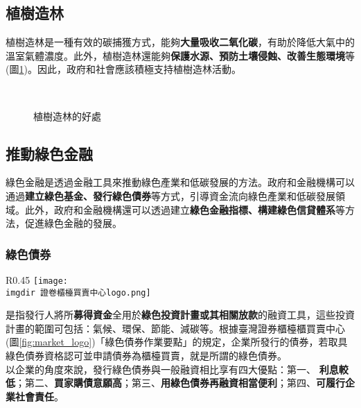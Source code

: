 \documentclass[12pt, a4paper]{article}
\begin{document}
\subsection{植樹造林}
植樹造林是一種有效的碳捕獲方式，能夠\textbf{\BB 大量吸收二氧化碳}，有助於降低大氣中的溫室氣體濃度。此外，植樹造林還能夠\textbf{\BB 保護水源、預防土壤侵蝕、改善生態環境}等(圖\ref{fig:tree})。因此，政府和社會應該積極支持植樹造林活動。
\begin{figure} [h]
    \centering
    \hspace{0.5cm} \\
    \hspace{0.5cm} 
    \caption{植樹造林的好處}\label{fig:tree}
\end{figure}


\subsection{推動綠色金融}
綠色金融是透過金融工具來推動綠色產業和低碳發展的方法。政府和金融機構可以通過\textbf{\BB 建立綠色基金、發行綠色債券}等方式，引導資金流向綠色產業和低碳發展領域。此外，政府和金融機構還可以透過建立\textbf{\BB 綠色金融指標、構建綠色信貸體系}等方法，促進綠色金融的發展。\\


\subsubsection{綠色債券}
\begin{wrapfigure}{R}{0.45\textwidth}
\centering
\texttt{[image: \\imgdir 證卷櫃檯買賣中心logo.png]}
\vspace{1.5cm}
\caption{證卷櫃檯買賣中心(PNG)}\label{fig:market_logo}
\end{wrapfigure}
是指發行人將所\textbf{募得資金}全用於\textbf{綠色投資計畫或其相關放款}的融資工具，這些投資計畫的範圍可包括：氣候、環保、節能、減碳等。根據臺灣證券櫃檯櫃買賣中心(圖\ref{fig:market_logo})「綠色債券作業要點」的規定，企業所發行的債券，若取具綠色債券資格認可並申請債券為櫃檯買賣，就是所謂的綠色債券。\\
以企業的角度來說，發行綠色債券與一般融資相比享有四大優點：第一、\textbf{ 利息較低}；第二、\textbf{買家購債意願高}；第三、\textbf{用綠色債券再融資相當便利}；第四、\textbf{可履行企業社會責任}。
\end{document}
